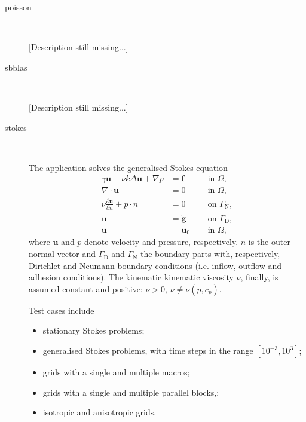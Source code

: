 \begin{description}
\begin{description}
  \item[poisson] \

    [Description still missing...]

  \item[sbblas] \

    [Description still missing...]

  \item[stokes] \

    The application solves the generalised Stokes equation
\begin{equation}
  \label{eq:stokes}
  \begin{array}{rll}
          \gamma \mathbf{u} - \nu k \Delta \mathbf{u} + \nabla p
         \!\!\!\!&= \mathbf{f} \qquad
         &\text{in } \Omega, \\
%
          \nabla\cdot \mathbf{u}
         \!\!\!\!&= 0
         &\text{in } \Omega, \\
%
        \nu \frac{\partial \mathbf{u}}{\partial n} + p \cdot n
        \!\!\!\!&= 0
        &\text{on } \Gamma_{\text{N}}, \\
%
        \mathbf{u}
        \!\!\!\!&= \mathbf{\tilde{g}}
        & \text{on } \Gamma_{\text{D}}, \\
%
          \mathbf{u}
         \!\!\!\!&=\mathbf{u}_0
         &\text{in } \Omega,
       \end{array}
\end{equation}
where $\mathbf{u}$ and $p$ denote velocity and pressure, respectively.
$n$ is the outer normal vector and $\Gamma_{\text{D}}$ and $\Gamma_{\text{N}}$ the
boundary parts with, respectively, Dirichlet and Neumann boundary
conditions (i.e. inflow, outflow and adhesion conditions). The kinematic 
kinematic viscosity $\nu$, finally, is assumed constant and positive: $\nu > 0$,
$\nu \ne \nu(p, c_p)$.

    Test cases include 
    \begin{itemize}
    \item stationary Stokes problems;
    \item generalised Stokes problems, with time steps in the range $[10^{-3}, 10^3]$;
    \item grids with a single and multiple macros;
    \item grids with a single and multiple parallel blocks,;
    \item isotropic and anisotropic grids.
    \end{itemize}

  \end{description}


\end{description}
